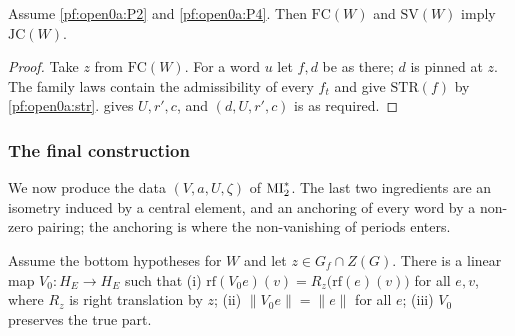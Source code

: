 \begin{proposition}\label{pf:open0a:joint}
Assume \ref{pf:open0a:P2} and \ref{pf:open0a:P4}. Then $\mathrm{FC}(W)$ and $\mathrm{SV}(W)$ imply $\mathrm{JC}(W)$.
\ 
\end{proposition}

\begin{proof}
Take $z$ from $\mathrm{FC}(W)$. For a word $u$ let $f,d$ be as there; $d$ is pinned at $z$. The family laws contain the
admissibility of every $f_t$ and give $\mathrm{STR}(f)$ by \cref{pf:open0a:str}.  gives
$U,r',c$, and $(d,U,r',c)$ is as required.
\end{proof}


\subsubsection{The final construction}\label{sec:pf:open0a:final}
We now produce the data $(V,a,U,\zeta)$ of $\mathrm{MI}^{*}_{2}$. The last two ingredients are an isometry induced by a
central element, and an anchoring of every word by a non-zero pairing; the anchoring is where the non-vanishing of
periods enters.

\begin{lemma}\label{pf:open0a:shift}
Assume the bottom hypotheses for $W$ and let $z\in G_f\cap Z(G)$. There is a linear map $V_0\colon H_E\to H_E$ such
that (i) $\mathrm{rf}(V_0e)(v)=R_z\bigl(\mathrm{rf}(e)(v)\bigr)$ for all $e,v$, where $R_z$ is right translation by
$z$; (ii) $\|V_0e\|=\|e\|$ for all $e$; (iii) $V_0$ preserves the true part.
\end{lemma}

